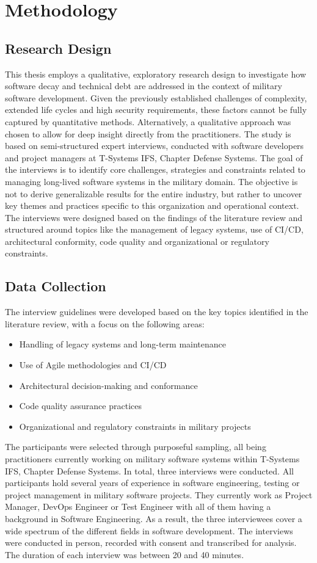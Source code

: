 \section{Methodology}
\subsection{Research Design}
This thesis employs a qualitative, exploratory research design to investigate how software decay and technical debt are addressed in the context of military software development. Given the previously established challenges of complexity, extended life cycles and high security requirements, these factors
cannot be fully captured by quantitative methods.
Alternatively, a qualitative approach was chosen to allow for deep insight directly from the practitioners. The study is based on semi-structured expert interviews, conducted with software developers and project managers at T-Systems IFS, Chapter Defense Systems. 
The goal of the interviews is to identify core challenges, strategies and constraints related to managing long-lived software systems in the military domain.
The objective is not to derive generalizable results for the entire industry, but rather to uncover key themes and practices specific to this organization and operational context. The interviews were designed based on the findings of the literature review and structured around topics like
the management of legacy systems, use of \ac{CI/CD}, architectural conformity, code quality and organizational or regulatory constraints.

\subsection{Data Collection}
The interview guidelines were developed based on the key topics identified in the literature review, with a focus on the following areas:
\begin{itemize}
    \item Handling of legacy systems and long-term maintenance
    \item Use of Agile methodologies and \ac{CI/CD}
    \item Architectural decision-making and conformance
    \item Code quality assurance practices
    \item Organizational and regulatory constraints in military projects
\end{itemize}
The participants were selected through purposeful sampling, all being practitioners currently working on military software systems within T-Systems IFS, Chapter Defense Systems. In total, three interviews were conducted. All participants hold several years of experience in software engineering, testing or project management
in military software projects. They currently work as Project Manager, DevOps Engineer or Test Engineer with all of them having a background in Software Engineering. As a result, the three interviewees cover a wide spectrum of the different fields in software development.
The interviews were conducted in person, recorded with consent and transcribed for analysis. The duration of each interview was between 20 and 40 minutes.

